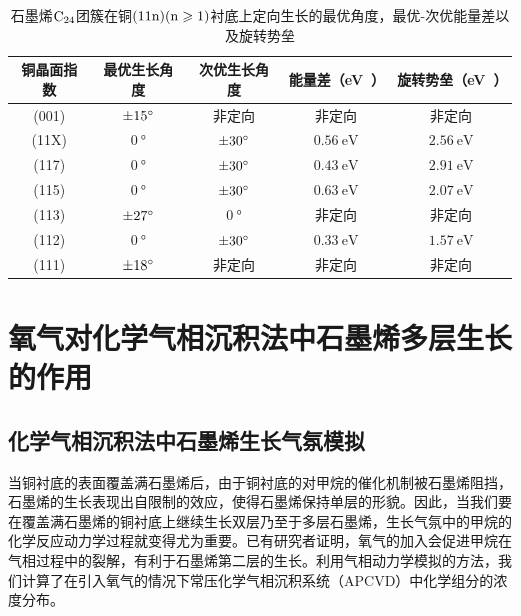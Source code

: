 \begin{table}[htb]
    \caption{石墨烯$\rm{C_{24}}$团簇在铜$\rm{(11n)(n \geqslant 1)}$衬底上定向生长的最优角度，最优-次优能量差以及旋转势垒}
    \centering
    \begin{tabular}{ccccc}
        \toprule
        铜晶面指数 & 最优生长角度            & 次优生长角度           & 能量差（\si\electronvolt）  & 旋转势垒（\si\electronvolt） \\
        \midrule
        (001)      & $\SI{\pm 15 }{\degree}$ & 非定向                 & 非定向                      & 非定向                       \\
        (11X)      & $\SI{0}{\degree}$       & $\SI{\pm 30}{\degree}$ & $\SI{0.56 }{\electronvolt}$ & $\SI{2.56 }{\electronvolt}$  \\
        (117)      & $\SI{0}{\degree}$       & $\SI{\pm 30}{\degree}$ & $\SI{0.43 }{\electronvolt}$ & $\SI{2.91 }{\electronvolt}$  \\
        (115)      & $\SI{0}{\degree}$       & $\SI{\pm 30}{\degree}$ & $\SI{0.63 }{\electronvolt}$ & $\SI{2.07 }{\electronvolt}$  \\
        (113)      & $\SI{\pm 27}{\degree}$  & $\SI{0}{\degree}$      & 非定向                      & 非定向                       \\
        (112)      & $\SI{0}{\degree}$       & $\SI{\pm 30}{\degree}$ & $\SI{0.33 }{\electronvolt}$ & $\SI{1.57 }{\electronvolt}$  \\
        (111)      & $\SI{\pm 18 }{\degree}$ & 非定向                 & 非定向                      & 非定向                       \\
        \bottomrule
    \end{tabular}
    \label{tab:GO_energyDiff_barrier}
\end{table}

\section{氧气对化学气相沉积法中石墨烯多层生长的作用}
\label{sec:石墨烯氧蚀刻穿透}
\def\muO#1{\mu_{\rm O}^{\rm #1} \it}
\def\halfEOm{ \frac{1}{2}E_{\rm \cemb{O2}} \it}
\def\EOa{\it E_{\rm O} \it }
\def\Cdis{\rm{\left[C_{dis.}\right]} \it }
\def\Odis{\rm{\left[O_{dis.}\right]} \it }
\def\RateV#1#2{\nu_{\rm #1}^{\rm #2} \it }
\def\RateK#1#2{\it{k_{\rm #1}^{\rm #2}} \it }
\def\ReactTime#1#2{\it{t_{\rm #1}^{\rm #2}} \it }
\def\cemb#1{\ce{#1}\mbox{}}

\subsection{化学气相沉积法中石墨烯生长气氛模拟}
\label{subsec:FLG_gasPhase}
当铜衬底的表面覆盖满石墨烯后，由于铜衬底的对甲烷的催化机制被石墨烯阻挡，石墨烯的生长表现出自限制的效应，使得石墨烯保持单层的形貌。因此，当我们要在覆盖满石墨烯的铜衬底上继续生长双层乃至于多层石墨烯，生长气氛中的甲烷的化学反应动力学过程就变得尤为重要。已有研究者证明，氧气的加入会促进甲烷在气相过程中的裂解，有利于石墨烯第二层的生长。利用气相动力学模拟的方法，我们计算了在引入氧气的情况下常压化学气相沉积系统（APCVD）中化学组分的浓度分布。

